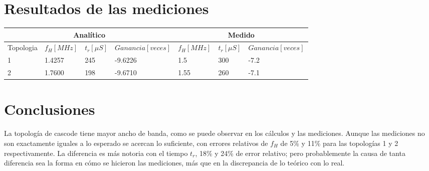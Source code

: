 \documentclass[letterpaper, 10 pt, conference]{ieeeconf}  %
\begin{document}
\section{Resultados de las mediciones}

 \begin{table}[H]
   \centering
   \begin{tabular}{|llll|lll|}
     \hline
     \multicolumn{4}{|c|}{Analítico}                                                    & \multicolumn{3}{c|}{Medido}                                                                                                                         \\ \hline
     \multicolumn{1}{|l|}{Topologia}  & \multicolumn{1}{l|}{$f_H \left[MHz\right]$}     & $t_r \left[\mu S\right]$          & \multicolumn{1}{|l|}{$Ganancia \left[veces\right]$}         & \multicolumn{1}{l|}{$f_H \left[MHz\right]$} & $t_r \left[\mu  S\right]$         & \multicolumn{1}{|l|}{$Ganancia \left[veces\right]$}             \\ \hline
     \multicolumn{1}{|l|}{1}          & \multicolumn{1}{l|}{1.4257}                     & 245                               & \multicolumn{1}{|l|}{-9.6226}                                  & \multicolumn{1}{l|}{1.5}                 & 300                                  & \multicolumn{1}{|l|}{-7.2}                                      \\ \hline
     \multicolumn{1}{|l|}{2}          & \multicolumn{1}{l|}{1.7600}                     & 198                               & \multicolumn{1}{|l|}{-9.6710}                                  & \multicolumn{1}{l|}{1.55}                & 260                                  & \multicolumn{1}{|l|}{-7.1}                                      \\ \hline
   \end{tabular}
 \end{table}

\section{Conclusiones}
La topología de cascode tiene mayor ancho de banda, como se puede observar en los cálculos y las mediciones. Aunque las mediciones no son exactamente iguales a lo esperado se acercan lo suficiente, con errores relativos de $f_H$ de 5\% y 11\% para las topologías 1 y 2 respectivamente. La diferencia es más notoria con el tiempo $t_r$, 18\% y 24\% de error relativo; pero probablemente la causa de tanta diferencia sea la forma en cómo se hicieron las mediciones, más que en la discrepancia de lo teórico con lo real.
\end{document}
